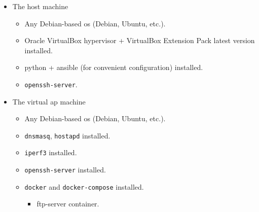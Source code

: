 \begin{itemize}
\tightlist
\item
The host machine

\begin{itemize}
	\tightlist
	\item
	Any Debian-based \acrshort{os} (Debian, Ubuntu, etc.).
	\item
	Oracle VirtualBox hypervisor + VirtualBox Extension Pack latest version installed.
	\item
	\gls{python} + \gls{ansible} (for convenient configuration) installed.
	\item
	\texttt{openssh-server}.
\end{itemize}
\item
  The virtual \acrshort{ap} machine

  \begin{itemize}
  \tightlist
  \item
    Any Debian-based \acrshort{os} (Debian, Ubuntu, etc.).
  \item
    \texttt{dnsmasq}, \texttt{hostapd} installed.
  \item
    \texttt{iperf3} installed.
  \item
    \texttt{openssh-server} installed.
  \item
    \texttt{docker} and \texttt{docker-compose} installed.

    \begin{itemize}
    \tightlist
    \item
      \acrshort{ftp}-server container.
    \end{itemize}
  \end{itemize}
\end{itemize}
